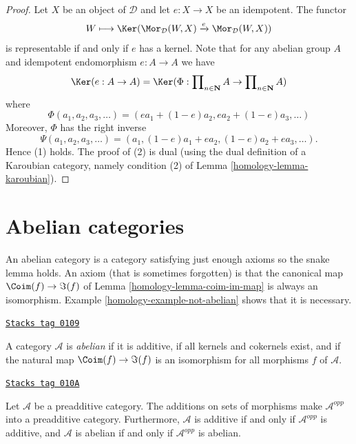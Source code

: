 \begin{proof}

Let $X$ be an object of $\mathcal{D}$ and let $e : X \to X$ be an idempotent.
The functor
$$
W \longmapsto \Ker(
\Mor_\mathcal{D}(W, X)
\xrightarrow{e}
\Mor_\mathcal{D}(W, X)
)
$$
is representable if and only if $e$ has a kernel. Note that for any
abelian group $A$ and idempotent endomorphism $e : A \to A$ we have
$$
\Ker(e : A \to A)
= \Ker(\Phi :
\prod\nolimits_{n \in \mathbf{N}} A
\to
\prod\nolimits_{n \in \mathbf{N}} A
)
$$
where
$$
\Phi(a_1, a_2, a_3, \ldots) = (ea_1 + (1 - e)a_2, ea_2 + (1 - e)a_3, \ldots)
$$
Moreover, $\Phi$ has the right inverse
$$
\Psi(a_1, a_2, a_3, \ldots) =
(a_1, (1 - e)a_1 + ea_2, (1 - e)a_2 + ea_3, \ldots).
$$
Hence (1) holds. The proof of (2) is dual (using the dual definition
of a Karoubian category, namely condition (2) of
Lemma \ref{homology-lemma-karoubian}).
\end{proof}

\section{Abelian categories}
\label{homology-section-abelian-categories}
An abelian category is a category satisfying just enough axioms so the
snake lemma holds. An axiom (that is sometimes forgotten)
is that the canonical map $\Coim(f) \to \Im(f)$
of Lemma \ref{homology-lemma-coim-im-map} is always an isomorphism.
Example \ref{homology-example-not-abelian} shows that it is necessary.

\begin{definition}
\label{homology-definition-abelian-category}
\href{https://stacks.math.columbia.edu/tag/0109}{\texttt{Stacks tag 0109}}

A category $\mathcal{A}$ is {\it abelian} if
it is additive, if all kernels and cokernels exist,
and if the natural map $\Coim(f) \to \Im(f)$
is an isomorphism for all morphisms $f$ of
$\mathcal{A}$.
\end{definition}

\begin{lemma}
\label{homology-lemma-abelian-opposite}
\href{https://stacks.math.columbia.edu/tag/010A}{\texttt{Stacks tag 010A}}

Let $\mathcal{A}$ be a preadditive category.
The additions on sets of morphisms make
$\mathcal{A}^{opp}$ into a preadditive category.
Furthermore, $\mathcal{A}$ is additive if and only if $\mathcal{A}^{opp}$
is additive, and
$\mathcal{A}$ is abelian if and only if $\mathcal{A}^{opp}$ is abelian.
\end{lemma}

